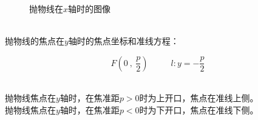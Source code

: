 \documentclass[UTF8]{ctexart}
\begin{document}
\begin{figure}[h!]
\begin{center}
{\begin{minipage}[t]{0.446\linewidth}
                \end{minipage}
            }
            \caption{抛物线在$x$轴时的图像}
        \end{center}
    \end{figure}\\
    抛物线的焦点在$y$轴时的焦点坐标和准线方程：\vspace{4pt}
    \begin{large}
        \begin{equation*}
            F\left(0~,~\frac{p}{2}\right)~~~~~~~~~~~~l:y=-\frac{p}{2}
        \end{equation*}
    \end{large}\\
    抛物线焦点在$y$轴时，在焦准距$p>0$时为上开口，焦点在准线上侧。\\[3mm]
    抛物线焦点在$y$轴时，在焦准距$p<0$时为下开口，焦点在准线下侧。

\newpage
\end{document}
